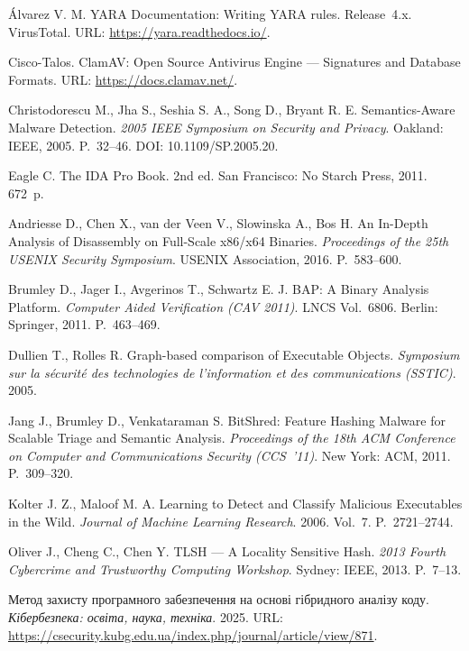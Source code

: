 
 Álvarez V. M. YARA Documentation: Writing YARA rules. Release~4.x. VirusTotal. URL: \url{https://yara.readthedocs.io/}.

 Cisco-Talos. ClamAV: Open Source Antivirus Engine --- Signatures and Database Formats. URL: \url{https://docs.clamav.net/}.

 Christodorescu M., Jha S., Seshia S. A., Song D., Bryant R. E. Semantics-Aware Malware Detection. \emph{2005 IEEE Symposium on Security and Privacy}. Oakland: IEEE, 2005. P.~32--46. DOI: 10.1109/SP.2005.20.

 Eagle C. The IDA Pro Book. 2nd ed. San Francisco: No Starch Press, 2011. 672~p.

 Andriesse D., Chen X., van der Veen V., Slowinska A., Bos H. An In-Depth Analysis of Disassembly on Full-Scale x86/x64 Binaries. \emph{Proceedings of the 25th USENIX Security Symposium}. USENIX Association, 2016. P.~583--600.

 Brumley D., Jager I., Avgerinos T., Schwartz E. J. BAP: A Binary Analysis Platform. \emph{Computer Aided Verification (CAV 2011)}. LNCS Vol.~6806. Berlin: Springer, 2011. P.~463--469.

 Dullien T., Rolles R. Graph-based comparison of Executable Objects. \emph{Symposium sur la sécurité des technologies de l'information et des communications (SSTIC)}. 2005.

 Jang J., Brumley D., Venkataraman S. BitShred: Feature Hashing Malware for Scalable Triage and Semantic Analysis. \emph{Proceedings of the 18th ACM Conference on Computer and Communications Security (CCS~'11)}. New York: ACM, 2011. P.~309--320.

 Kolter J. Z., Maloof M. A. Learning to Detect and Classify Malicious Executables in the Wild. \emph{Journal of Machine Learning Research}. 2006. Vol.~7. P.~2721--2744.

 Oliver J., Cheng C., Chen Y. TLSH --- A Locality Sensitive Hash. \emph{2013 Fourth Cybercrime and Trustworthy Computing Workshop}. Sydney: IEEE, 2013. P.~7--13.

 Метод захисту програмного забезпечення на основі гібридного аналізу коду. \emph{Кібербезпека: освіта, наука, техніка}. 2025. URL: \url{https://csecurity.kubg.edu.ua/index.php/journal/article/view/871}.

